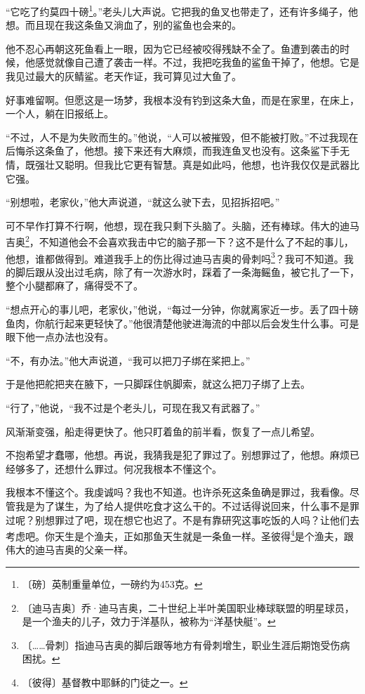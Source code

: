 \documentclass[12pt,UTF-8,openany]{ctexbook}
\begin{document}
\begin{large}
    “它吃了约莫四十磅\footnote{〔磅〕英制重量单位，一磅约为453克。}。”老头儿大声说。它把我的鱼叉也带走了，还有许多绳子，他想。而且现在我这条鱼又淌血了，别的鲨鱼也会来的。
    
    他不忍心再朝这死鱼看上一眼，因为它已经被咬得残缺不全了。鱼遭到袭击的时候，他感觉就像自己遭了袭击一样。不过，我把吃我鱼的鲨鱼干掉了，他想。它是我见过最大的灰鲭鲨。老天作证，我可算见过大鱼了。
    
    好事难留啊。但愿这是一场梦，我根本没有钓到这条大鱼，而是在家里，在床上，一个人，躺在旧报纸上。
    
    “不过，人不是为失败而生的。”他说，“人可以被摧毁，但不能被打败。”不过我现在后悔杀这条鱼了，他想。接下来还有大麻烦，而我连鱼叉也没有。这条鲨下手无情，既强壮又聪明。但我比它更有智慧。真是如此吗，他想，也许我仅仅是武器比它强。
    
    “别想啦，老家伙，”他大声说道，“就这么驶下去，见招拆招吧。”
    
    可不早作打算不行啊，他想，现在我只剩下头脑了。头脑，还有棒球。伟大的迪马吉奥\footnote{〔迪马吉奥〕乔·迪马吉奥，二十世纪上半叶美国职业棒球联盟的明星球员，是一个渔夫的儿子，效力于洋基队，被称为“洋基快艇”。}，不知道他会不会喜欢我击中它的脑子那一下？这不是什么了不起的事儿，他想，谁都做得到。难道我手上的伤比得过迪马吉奥的骨刺吗\footnote{〔……骨刺〕指迪马吉奥的脚后跟等地方有骨刺增生，职业生涯后期饱受伤病困扰。}？我可不知道。我的脚后跟从没出过毛病，除了有一次游水时，踩着了一条海鳐鱼，被它扎了一下，整个小腿都麻了，痛得受不了。
    
    “想点开心的事儿吧，老家伙，”他说，“每过一分钟，你就离家近一步。丢了四十磅鱼肉，你航行起来更轻快了。”他很清楚他驶进海流的中部以后会发生什么事。可是眼下他一点办法也没有。
    
    “不，有办法。”他大声说道，“我可以把刀子绑在桨把上。”
    
    于是他把舵把夹在腋下，一只脚踩住帆脚索，就这么把刀子绑了上去。
    
    “行了，”他说，“我不过是个老头儿，可现在我又有武器了。”
    
    风渐渐变强，船走得更快了。他只盯着鱼的前半看，恢复了一点儿希望。
    
    不抱希望才蠢哪，他想。再说，我猜我是犯了罪过了。别想罪过了，他想。麻烦已经够多了，还想什么罪过。何况我根本不懂这个。
    
    我根本不懂这个。我虔诚吗？我也不知道。也许杀死这条鱼确是罪过，我看像。尽管我是为了谋生，为了给人提供吃食才这么干的。不过话得说回来，什么事不是罪过呢？别想罪过了吧，现在想它也迟了。不是有靠研究这事吃饭的人吗？让他们去考虑吧。你天生是个渔夫，正如那鱼天生就是一条鱼一样。圣彼得\footnote{〔彼得〕基督教中耶稣的门徒之一。}是个渔夫，跟伟大的迪马吉奥的父亲一样。
    

\end{large}
\end{document}
